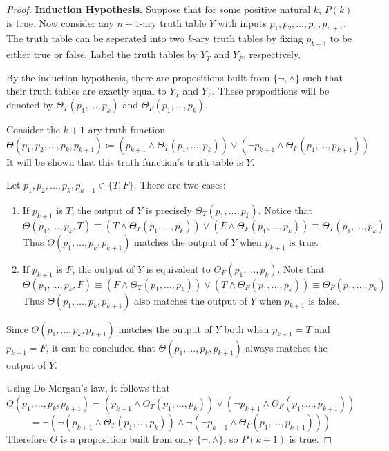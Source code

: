 \documentclass[11pt]{article}
\begin{document}
\begin{enumerate}[label=\alph*)]
\begin{proof}
            \textbf{Induction Hypothesis.} Suppose that for some positive natural \(k\), \(P(k)\) is true. Now consider any \(n+1\)-ary truth table \(Y\) with inputs \(p_1, p_2, \dots, p_n, p_{n+1}\). The truth table can be seperated into two \(k\)-ary truth tables by fixing \(p_{k+1}\) to be either true or false. Label the truth tables by \(Y_T\) and \(Y_F\), respectively.
            
            By the induction hypothesis, there are propositions built from \(\{\neg, \land\}\) such that their truth tables are exactly equal to \(Y_T\) and \(Y_F\). These propositions will be denoted by \(\Theta _T(p_1, \dots, p_k)\) and \(\Theta _F (p_1, \dots, p_k)\).

            Consider the \(k+1\)-ary truth function
            \[
                \Theta (p_1,p_2, \dots, p_k, p_{k+1}) \coloneqq (p_{k+1} \land \Theta _T(p_1, \dots, p_k)) \lor (\neg p_{k+1} \land \Theta _F (p_1, \dots, p_{k+1}))
            \] 
            It will be shown that this truth function's truth table is \(Y\).

            Let \(p_1,p_2, \dots, p_k, p_{k+1} \in \{T, F\}\). There are two cases:
            \begin{enumerate}
                \item If \(p_{k+1}\) is \(T\), the output of \(Y\) is precisely \(\Theta _T(p_1, \dots, p_k)\). Notice that
                \[
                    \Theta (p_1, \dots, p_k, T) \equiv (T \land \Theta _T(p_1, \dots, p_k)) \lor (F \land \Theta _F (p_1, \dots, p_k)) \equiv \Theta _T(p_1, \dots, p_k)
                \]
                Thus \(\Theta (p_1, \dots, p_k, p_{k+1})\) matches the output of \(Y\) when \(p_{k+1}\) is true.
                \item If \(p_{k+1}\) is \(F\), the output of \(Y\) is equivalent to \(\Theta _F (p_1, \dots, p_k)\). Note that
                \[
                    \Theta (p_1, \dots, p_k, F) \equiv (F \land \Theta _T(p_1, \dots, p_k)) \lor (T \land \Theta _F (p_1, \dots, p_k)) \equiv \Theta _F(p_1, \dots, p_k)
                \]
                Thus \(\Theta (p_1, \dots, p_k, p_{k+1})\) also matches the output of \(Y\) when \(p_{k+1}\) is false.
            \end{enumerate}
            Since \(\Theta (p_1, \dots, p_k, p_{k+1})\) matches the output of \(Y\) both when \(p_{k+1} = T\) and \(p_{k+1} = F\), it can be concluded that \(\Theta (p_1, \dots, p_k, p_{k+1})\) always matches the output of \(Y\).

            Using De Morgan's law, it follows that
            \[
                \Theta (p_1, \dots, p_k, p_{k+1}) = (p_{k+1} \land \Theta _T(p_1, \dots, p_k)) \lor (\neg p_{k+1} \land \Theta _F (p_1, \dots, p_{k+1}))
            \]
            \[
                = \neg (\neg(p_{k+1} \land \Theta _T(p_1, \dots, p_k)) \land \neg(\neg p_{k+1} \land \Theta _F (p_1, \dots, p_{k+1})))
            \]
            Therefore \(\Theta\) is a proposition built from only \(\{\neg, \land\}\), so \(P(k+1)\) is true.


\end{proof}
\end{enumerate}
\end{document}
